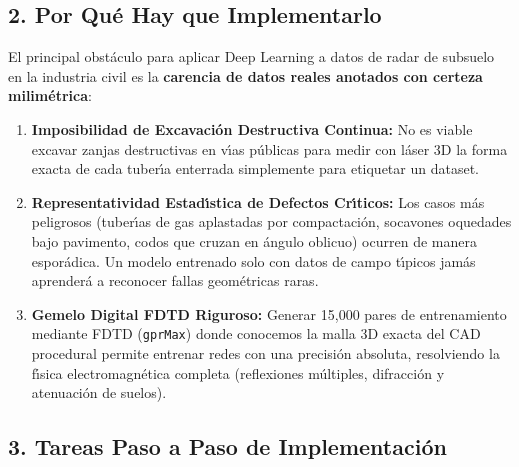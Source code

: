\documentclass[11pt,a4paper]{article}
\begin{document}
\subsection{2. Por Qu{\'e} Hay que Implementarlo}
El principal obst{\'a}culo para aplicar Deep Learning a datos de radar de subsuelo en la industria civil es la \textbf{carencia de datos reales anotados con certeza milim{\'e}trica}:
\begin{enumerate}
    \item \textbf{Imposibilidad de Excavaci{\'o}n Destructiva Continua:} No es viable excavar zanjas destructivas en v{\'\i}as p{\'u}blicas para medir con l{\'a}ser 3D la forma exacta de cada tuber{\'\i}a enterrada simplemente para etiquetar un dataset.
    \item \textbf{Representatividad Estad{\'\i}stica de Defectos Cr{\'\i}ticos:} Los casos m{\'a}s peligrosos (tuber{\'\i}as de gas aplastadas por compactaci{\'o}n, socavones oquedades bajo pavimento, codos que cruzan en {\'a}ngulo oblicuo) ocurren de manera espor{\'a}dica. Un modelo entrenado solo con datos de campo t{\'\i}picos jam{\'a}s aprender{\'a} a reconocer fallas geom{\'e}tricas raras.
    \item \textbf{Gemelo Digital FDTD Riguroso:} Generar 15,000 pares de entrenamiento mediante FDTD (\texttt{gprMax}) donde conocemos la malla 3D exacta del CAD procedural permite entrenar redes con una precisi{\'o}n absoluta, resolviendo la f{\'\i}sica electromagn{\'e}tica completa (reflexiones m{\'u}ltiples, difracci{\'o}n y atenuaci{\'o}n de suelos).
\end{enumerate}

\subsection{3. Tareas Paso a Paso de Implementaci{\'o}n}
\end{document}
